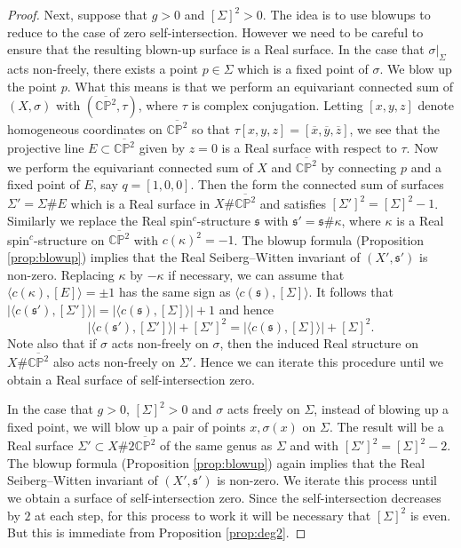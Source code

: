 \documentclass{amsart}
\theoremstyle{definition}
\theoremstyle{remark}
\numberwithin{equation}{section}
\begin{document}
\begin{proof}
Next, suppose that $g > 0$ and $[\Sigma]^2 > 0$. The idea is to use blowups to reduce to the case of zero self-intersection. However we need to be careful to ensure that the resulting blown-up surface is a Real surface. In the case that $\sigma|_\Sigma$ acts non-freely, there exists a point $p \in \Sigma$ which is a fixed point of $\sigma$. We blow up the point $p$. What this means is that we perform an equivariant connected sum of $(X , \sigma)$ with $(\overline{\mathbb{CP}^2} , \tau)$, where $\tau$ is complex conjugation. Letting $[x,y,z]$ denote homogeneous coordinates on $\overline{\mathbb{CP}^2}$ so that $\tau[x,y,z] = [\overline{x},\overline{y},\overline{z}]$, we see that the projective line $E \subset \overline{\mathbb{CP}^2}$ given by $z=0$ is a Real surface with respect to $\tau$. Now we perform the equivariant connected sum of $X$ and $\overline{\mathbb{CP}^2}$ by connecting $p$ and a fixed point of $E$, say $q = [1,0,0]$. Then the form the connected sum of surfaces $\Sigma' = \Sigma \# E$ which is a Real surface in $X \# \overline{\mathbb{CP}^2}$ and satisfies $[\Sigma']^2 = [\Sigma]^2 - 1$. Similarly we replace the Real spin$^c$-structure $\mathfrak{s}$ with $\mathfrak{s}' = \mathfrak{s} \# \kappa$, where $\kappa$ is a Real spin$^c$-structure on $\overline{\mathbb{CP}^2}$ with $c(\kappa)^2 = -1$. The blowup formula (Proposition \ref{prop:blowup}) implies that the Real Seiberg--Witten invariant of $(X' , \mathfrak{s}')$ is non-zero. Replacing $\kappa$ by $-\kappa$ if necessary, we can assume that $\langle c(\kappa) , [E] \rangle = \pm 1$ has the same sign as $\langle c(\mathfrak{s}) , [\Sigma] \rangle$. It follows that $|\langle c(\mathfrak{s}') , [\Sigma'] \rangle | = |\langle c(\mathfrak{s}) , [\Sigma] \rangle | + 1$ and hence
\[
| \langle c(\mathfrak{s}') , [\Sigma'] \rangle | + [\Sigma']^2 = | \langle c(\mathfrak{s}) , [\Sigma] \rangle | + [\Sigma]^2.
\]
Note also that if $\sigma$ acts non-freely on $\sigma$, then the induced Real structure on $X \# \overline{\mathbb{CP}^2}$ also acts non-freely on $\Sigma'$. Hence we can iterate this procedure until we obtain a Real surface of self-intersection zero.

In the case that $g > 0$, $[\Sigma]^2 > 0$ and $\sigma$ acts freely on $\Sigma$, instead of blowing up a fixed point, we will blow up a pair of points $x , \sigma(x)$ on $\Sigma$. The result will be a Real surface $\Sigma' \subset X \# 2 \overline{\mathbb{CP}^2}$ of the same genus as $\Sigma$ and with $[\Sigma']^2 = [\Sigma]^2 - 2$. The blowup formula (Proposition \ref{prop:blowup}) again implies that the Real Seiberg--Witten invariant of $(X' , \mathfrak{s}')$ is non-zero. We iterate this process until we obtain a surface of self-intersection zero. Since the self-intersection decreases by $2$ at each step, for this process to work it will be necessary that $[\Sigma]^2$ is even. But this is immediate from Proposition \ref{prop:deg2}.


\end{proof}
\end{document}
